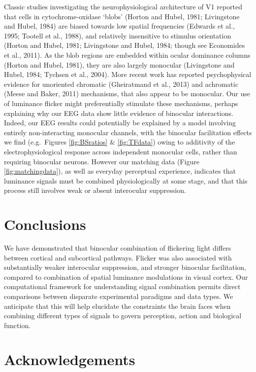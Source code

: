 \documentclass[
]{article}
\begin{document}
Classic studies investigating the neurophysiological architecture of V1 reported that cells in cytochrome-oxidase `blobs' (Horton and Hubel, 1981; Livingstone and Hubel, 1984) are biased towards low spatial frequencies (Edwards et al., 1995; Tootell et al., 1988), and relatively insensitive to stimulus orientation (Horton and Hubel, 1981; Livingstone and Hubel, 1984; though see Economides et al., 2011). As the blob regions are embedded within ocular dominance columns (Horton and Hubel, 1981), they are also largely monocular (Livingstone and Hubel, 1984; Tychsen et al., 2004). More recent work has reported psychophysical evidence for unoriented chromatic (Gheiratmand et al., 2013) and achromatic (Meese and Baker, 2011) mechanisms, that also appear to be monocular. Our use of luminance flicker might preferentially stimulate these mechanisms, perhaps explaining why our EEG data show little evidence of binocular interactions. Indeed, our EEG results could potentially be explained by a model involving entirely non-interacting monocular channels, with the binocular facilitation effects we find (e.g.~Figures \ref{fig:BSratios} \& \ref{fig:TFdata}) owing to additivity of the electrophysiological response across independent monocular cells, rather than requiring binocular neurons. However our matching data (Figure \ref{fig:matchingdata}), as well as everyday perceptual experience, indicates that luminance signals must be combined physiologically at some stage, and that this process still involves weak or absent interocular suppression.

\hypertarget{conclusions}{%
\section{Conclusions}\label{conclusions}}

We have demonstrated that binocular combination of flickering light differs between cortical and subcortical pathways. Flicker was also associated with substantially weaker interocular suppression, and stronger binocular facilitation, compared to combination of spatial luminance modulations in visual cortex. Our computational framework for understanding signal combination permits direct comparisons between disparate experimental paradigms and data types. We anticipate that this will help elucidate the constraints the brain faces when combining different types of signals to govern perception, action and biological function.

\hypertarget{acknowledgements}{%
\section{Acknowledgements}\label{acknowledgements}}
\end{document}
